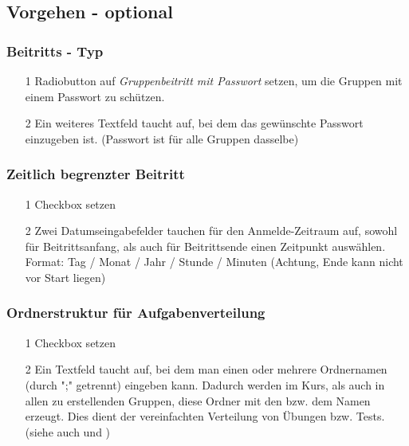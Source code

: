 \subsection*{Vorgehen - optional}

\subsubsection*{Beitritts - Typ}
\begin{itemize}
	\item[1] Radiobutton auf  \textit{Gruppenbeitritt mit Passwort}   setzen, um die Gruppen mit einem Passwort zu schützen. 
	\item[2] Ein weiteres Textfeld taucht auf, bei dem das gewünschte Passwort einzugeben ist. (Passwort ist für alle Gruppen dasselbe)
\end{itemize}

\subsubsection*{Zeitlich begrenzter Beitritt}
\begin{itemize}
	\item[1] Checkbox setzen 
	\item[2] Zwei Datumseingabefelder tauchen für den Anmelde-Zeitraum auf, sowohl für Beitrittsanfang, als auch für Beitrittsende einen Zeitpunkt auswählen. Format: Tag / Monat / Jahr / Stunde / Minuten 
	(Achtung, Ende kann nicht vor Start liegen)
	
\end{itemize}

\subsubsection*{Ordnerstruktur für Aufgabenverteilung}
\begin{itemize}
	\item[1] Checkbox setzen 
	\item[2] Ein Textfeld taucht auf, bei dem man einen oder mehrere Ordnernamen (durch ";" getrennt) eingeben kann. Dadurch werden im Kurs, als auch in allen zu erstellenden Gruppen, diese Ordner mit den bzw. dem Namen erzeugt. Dies dient der vereinfachten Verteilung von Übungen bzw. Tests. (siehe auch  und )
	
\end{itemize}
\clearpage

